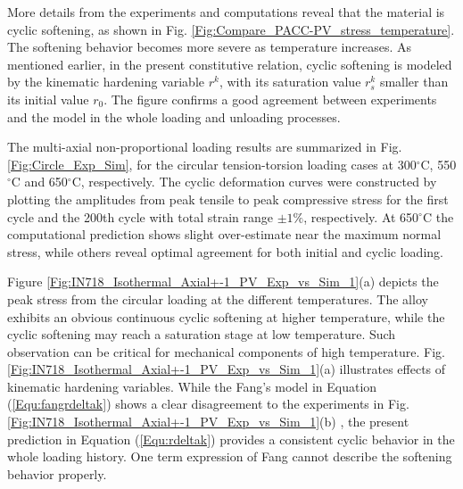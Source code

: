 \documentclass[preprint,5p,twocolumn,11pt,sort&compress]{elsarticle}
\begin{document}
\begin{figure*}[!]
\caption{Comparison between experiments and computations  under isothermal non-proportional loading conditions at  300, 550, 650$^{\circ}$C. (a) The first loading cycle. (b) The 200th cycle.}
\label{Fig:Circle_Exp_Sim}
\end{figure*}


More details from the experiments and computations reveal that the material is cyclic softening, as shown in Fig. \ref{Fig:Compare_PACC-PV_stress_temperature}. The softening behavior becomes more severe as  temperature increases.
As mentioned earlier, in the present constitutive relation, cyclic softening is modeled by the kinematic hardening variable $r^k$, with its saturation value $r_s^k$ smaller than its initial value $r_0$.
The figure confirms a good agreement between experiments and the model in the whole loading and unloading processes.


The multi-axial non-proportional loading results are summarized in Fig. \ref{Fig:Circle_Exp_Sim}, for the circular tension-torsion loading cases at 300$^{\circ}$C, 550$^{\circ}$C and 650$^{\circ}$C, respectively. The cyclic deformation curves were constructed by plotting the amplitudes from peak tensile to peak compressive stress for the first cycle and the 200th cycle with total strain range $\pm1\%$, respectively. At 650$^{\circ}$C the computational prediction shows slight over-estimate near the maximum normal stress, while others reveal optimal agreement for both initial and cyclic loading.

Figure \ref{Fig:IN718_Isothermal_Axial+-1_PV_Exp_vs_Sim_1}(a) depicts the peak stress from the circular loading at the different temperatures.
The alloy exhibits an obvious continuous cyclic softening at higher temperature, while the cyclic softening may reach a saturation stage at low temperature. Such observation can be critical for mechanical components of high temperature.
Fig. \ref{Fig:IN718_Isothermal_Axial+-1_PV_Exp_vs_Sim_1}(a) illustrates effects of kinematic hardening variables. While the Fang's model  \cite{fang2015cyclic}  in Equation (\ref{Equ:fangrdeltak}) shows a clear disagreement to the experiments in Fig. \ref{Fig:IN718_Isothermal_Axial+-1_PV_Exp_vs_Sim_1}(b) , the present prediction in Equation (\ref{Equ:rdeltak}) provides a consistent cyclic behavior in the whole loading history. One term expression of Fang cannot describe the softening behavior properly.
\end{document}
